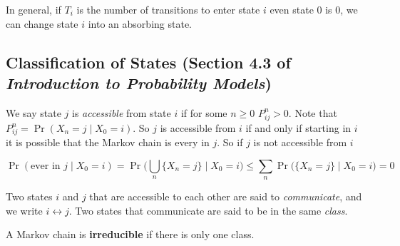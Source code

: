 In general, if \(T_i\) is the number of transitions to enter state \(i\) even state 0 is 0, we can change state \(i\) into an absorbing state.

\subsection{Classification of States (Section 4.3 of \textit{Introduction to Probability Models})}

We say state \(j\) is \textit{accessible} from state \(i\) if for some \(n \geq 0\) \(P_{ij}^n > 0\). Note that \(P_{ij}^n=\Pr(X_n = j \mid X_0 = i)\). So \(j\) is accessible from \(i\) if and only if starting in \(i\) it is possible that the Markov chain is every in \(j\). So if \(j\) is not accessible from \(i\)

\[
\Pr(\text{ever in } j \mid X_0 = i) = \Pr \bigg( \bigcup_{n} \{X_n = j \} \mid X_0 = i \bigg) \leq \sum_{n} \Pr \big( \{X_n = j \} \mid X_0 = i \big) = 0
\]

Two states \(i\) and \(j\) that are accessible to each other are said to \textit{communicate}, and we write \(i \leftrightarrow j\). Two states that communicate are said to be in the same \textit{class}.

A Markov chain is \textbf{irreducible} if there is only one class.

